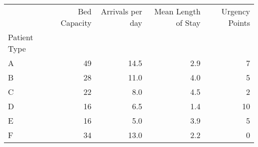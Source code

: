 \begin{tabular}{lrrrr}
\toprule
 & Bed Capacity & Arrivals per day & Mean Length of Stay & Urgency Points \\
Patient Type &  &  &  &  \\
\midrule
A & 49 & 14.5 & 2.9 & 7 \\
B & 28 & 11.0 & 4.0 & 5 \\
C & 22 & 8.0 & 4.5 & 2 \\
D & 16 & 6.5 & 1.4 & 10 \\
E & 16 & 5.0 & 3.9 & 5 \\
F & 34 & 13.0 & 2.2 & 0 \\
\bottomrule
\end{tabular}
